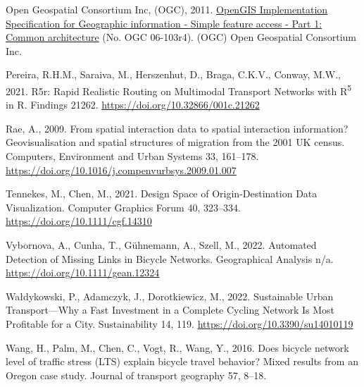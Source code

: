 \documentclass{isprs} %
\newlength{\cslhangindent}
\newlength{\cslentryspacingunit} %
\newenvironment{CSLReferences}[2] %
 {%
  \setlength{\parindent}{0pt}
  \ifodd #1
  \let\oldpar\par
  \def\par{\hangindent=\cslhangindent\oldpar}
  \fi
  \setlength{\parskip}{#2\cslentryspacingunit}
 }%
 {}
\begin{document}
\begin{CSLReferences}{0}{0}
\leavevmode{}%
Open Geospatial Consortium Inc, (OGC), 2011. \href{https://www.ogc.org/standards/sfa}{{OpenGIS Implementation Specification} for {Geographic} information - {Simple} feature access - {Part} 1: {Common} architecture} (No. OGC 06-103r4). {(OGC) Open Geospatial Consortium Inc.}

\leavevmode{}%
Pereira, R.H.M., Saraiva, M., Herszenhut, D., Braga, C.K.V., Conway, M.W., 2021. R5r: {Rapid Realistic Routing} on {Multimodal Transport Networks} with {R}{\textsuperscript{5}} in {R}. Findings 21262. \url{https://doi.org/10.32866/001c.21262}

\leavevmode{}%
Rae, A., 2009. From spatial interaction data to spatial interaction information? {Geovisualisation} and spatial structures of migration from the 2001 {UK} census. Computers, Environment and Urban Systems 33, 161--178. \url{https://doi.org/10.1016/j.compenvurbsys.2009.01.007}

\leavevmode{}%
Tennekes, M., Chen, M., 2021. Design {Space} of {Origin-Destination Data Visualization}. Computer Graphics Forum 40, 323--334. \url{https://doi.org/10.1111/cgf.14310}

\leavevmode{}%
Vybornova, A., Cunha, T., Gühnemann, A., Szell, M., 2022. Automated {Detection} of {Missing Links} in {Bicycle Networks}. Geographical Analysis n/a. \url{https://doi.org/10.1111/gean.12324}

\leavevmode{}%
Wałdykowski, P., Adamczyk, J., Dorotkiewicz, M., 2022. Sustainable {Urban Transport}---{Why} a {Fast Investment} in a {Complete Cycling Network Is Most Profitable} for a {City}. Sustainability 14, 119. \url{https://doi.org/10.3390/su14010119}

\leavevmode{}%
Wang, H., Palm, M., Chen, C., Vogt, R., Wang, Y., 2016. Does bicycle network level of traffic stress ({LTS}) explain bicycle travel behavior? {Mixed} results from an {Oregon} case study. Journal of transport geography 57, 8--18.

\end{CSLReferences}
\end{document}
